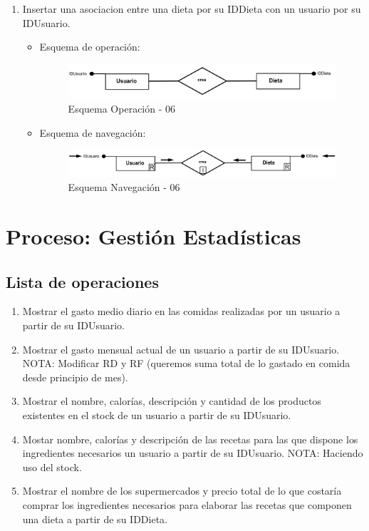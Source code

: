 \documentclass[a4paper,12pt]{report}
\begin{document}
\begin{enumerate}
\item Insertar una asociacion entre una dieta por su IDDieta con un usuario por su IDUsuario.
\begin{itemize}
\item Esquema de operación:
\begin{figure}[!htp]
\centering
\includegraphics[width=0.9\linewidth]{./operaciones/img/Dietas/06_ope.png}
\caption{Esquema Operación - 06}
\label{fig:ope06}
\medskip
\footnotesize
{}
\end{figure}
\item Esquema de navegación:
\begin{figure}[!htp]
\centering
\includegraphics[width=0.9\linewidth]{./operaciones/img/Dietas/06_nav.png}
\caption{Esquema Navegación - 06}
\label{fig:nave06}
\medskip
\footnotesize
{}
\end{figure}
\end{itemize}
\end{enumerate}
\section{Proceso: Gestión Estadísticas}
\label{sec-7-6}
\subsection{Lista de operaciones}
\label{sec-7-6-1}
\begin{enumerate}
\item Mostrar el gasto medio diario en las comidas realizadas por un
usuario a partir de su IDUsuario.
\item Mostrar el gasto mensual actual de un usuario a partir de su
IDUsuario.
NOTA: Modificar RD y RF (queremos suma total de lo gastado en
comida desde principio de mes).
\item Mostrar el nombre, calorías, descripción y cantidad de los
productos existentes en el stock de un usuario a partir de su
IDUsuario.
\item Mostar nombre, calorías y descripción de las recetas para las
que dispone los ingredientes necesarios un usuario a partir de
su IDUsuario.
NOTA: Haciendo uso del stock.
\item Mostrar el nombre de los supermercados y precio total de lo que
costaría comprar los ingredientes necesarios para elaborar las
recetas que componen una dieta a partir de su IDDieta.
\end{enumerate}
\end{document}
